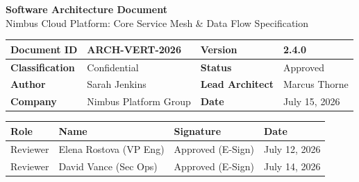 \documentclass[11pt,a4paper]{article}
\begin{document}
\begin{center}
  \sffamily
  \color{primary}
  {\Huge\bfseries Software Architecture Document}\\[0.3cm]
  {\large\color{secondary}Nimbus Cloud Platform: Core Service Mesh \& Data Flow Specification}\\[0.6cm]
\end{center}

\begin{table}[h]
\centering
\sffamily\small
\begin{tabularx}{\linewidth}{|l|X|l|X|}
\hline
\rowcolor{lightbg}\textbf{Document ID} & ARCH-VERT-2026 & \textbf{Version} & 2.4.0 \\
\hline
\textbf{Classification} & Confidential & \textbf{Status} & Approved \\
\hline
\rowcolor{lightbg}\textbf{Author} & Sarah Jenkins & \textbf{Lead Architect} & Marcus Thorne \\
\hline
\textbf{Company} & Nimbus Platform Group & \textbf{Date} & July 15, 2026 \\
\hline
\end{tabularx}
\end{table}

\begin{table}[h]
\centering
\sffamily\small
\begin{tabularx}{\linewidth}{|l|X|l|X|}
\hline
\rowcolor{lightbg}\textbf{Role} & \textbf{Name} & \textbf{Signature} & \textbf{Date} \\
\hline
Reviewer & Elena Rostova (VP Eng) & Approved (E-Sign) & July 12, 2026 \\
\hline
\rowcolor{lightbg}Reviewer & David Vance (Sec Ops) & Approved (E-Sign) & July 14, 2026 \\
\hline
\end{tabularx}
\end{table}

\vspace{0.4cm}
\begin{abstract}
This document outlines the system architecture for the core service mesh of the Nimbus Cloud Platform. It provides a detailed blueprint of the services managed under the Vertex Engine, detailing routing boundaries, internal state machine flows via the Nexa Gateway, telemetry streaming boundaries, and secure transactional databases managed via Meridian DB. The goal of this architecture is to provide high availability, fault tolerance, and absolute separation of concerns between our data ingress and analytical processing workloads.
\end{abstract}
\end{document}
